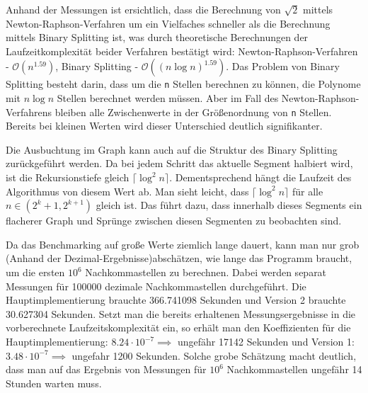 \documentclass[course=erap]{aspdoc}
\begin{document}
 Anhand der Messungen ist ersichtlich, dass die Berechnung von $\sqrt{2}$ mittels Newton-Raphson-Verfahren um ein Vielfaches schneller als die Berechnung mittels Binary Splitting ist, was durch theoretische Berechnungen der Laufzeitkomplexität beider Verfahren bestätigt wird: Newton-Raphson-Verfahren  - $\mathcal{O}(n^{1.59})$, Binary Splitting - $\mathcal{O}((n\log{ n})^{1.59})$. Das Problem von Binary Splitting besteht darin, dass um die \texttt{n} Stellen berechnen zu können, die Polynome mit $n\log{n}$ Stellen berechnet werden müssen. Aber im Fall des Newton-Raphson-Verfahrens bleiben alle Zwischenwerte in der Größenordnung von \texttt{n} Stellen. Bereits bei kleinen Werten wird dieser Unterschied deutlich signifikanter.
 
Die Ausbuchtung im Graph kann auch auf die Struktur des Binary Splitting zurückgeführt werden. Da bei jedem Schritt das aktuelle Segment halbiert wird, ist die Rekursionstiefe gleich $\lceil\log^{2}{n}\rceil$. Dementsprechend hängt die Laufzeit des Algorithmus von diesem Wert ab. Man sieht leicht, dass $\lceil\log^{2}{n}\rceil$ für alle $n \in (2^{k} + 1,  2^{k + 1})$ gleich ist. Das führt dazu, dass innerhalb dieses Segments ein flacherer Graph und Sprünge zwischen diesen Segmenten zu beobachten sind. 

Da das Benchmarking auf große Werte ziemlich lange dauert, kann man nur grob (Anhand der Dezimal-Ergebnisse)abschätzen, wie lange das Programm braucht, um die ersten $10^{6}$ Nachkommastellen zu berechnen. Dabei werden separat Messungen für 100000 dezimale Nachkommastellen durchgeführt. Die Hauptimplementierung brauchte 366.741098 Sekunden und Version 2 brauchte 30.627304 Sekunden. Setzt man die bereits erhaltenen Messungsergebnisse in die vorberechnete Laufzeitskomplexität ein, so erhält man den Koeffizienten für die Hauptimplementierung: $8.24 \cdot 10 ^ {-7} \implies$ ungefähr 17142 Sekunden und Version 1: $3.48 \cdot 10 ^{-7} \implies$ ungefahr 1200 Sekunden. Solche grobe Schätzung macht deutlich, dass man auf das Ergebnis von Messungen für $10^{6}$ Nachkommastellen ungefähr 14 Stunden warten muss.
\end{document}

